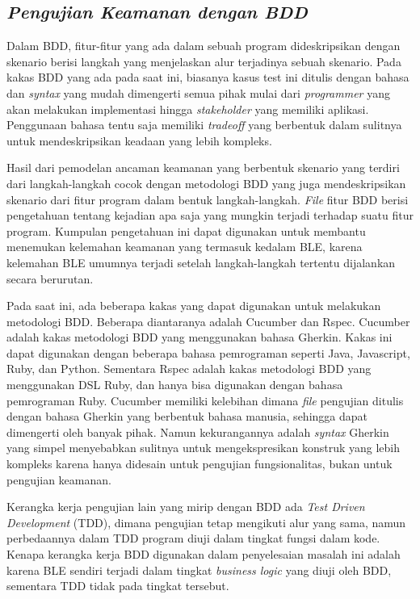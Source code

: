 \subsection{\textit{Pengujian Keamanan dengan BDD}}

Dalam BDD, fitur-fitur yang ada dalam sebuah program dideskripsikan dengan skenario
berisi langkah yang menjelaskan alur terjadinya sebuah skenario. Pada kakas BDD
yang ada pada saat ini, biasanya kasus test ini ditulis dengan bahasa dan \emph{syntax}
yang mudah dimengerti semua pihak mulai dari \emph{programmer} yang akan melakukan implementasi
hingga \emph{stakeholder} yang memiliki aplikasi. Penggunaan bahasa tentu saja memiliki \emph{tradeoff}
yang berbentuk dalam sulitnya untuk mendeskripsikan keadaan yang lebih kompleks.

Hasil dari pemodelan ancaman keamanan yang berbentuk skenario yang terdiri dari langkah-langkah
cocok dengan metodologi BDD yang juga mendeskripsikan skenario dari fitur program dalam bentuk
langkah-langkah. \emph{File} fitur BDD berisi pengetahuan tentang kejadian apa saja yang mungkin
terjadi terhadap suatu fitur program. Kumpulan pengetahuan ini dapat digunakan untuk
membantu menemukan kelemahan keamanan yang termasuk kedalam BLE, karena kelemahan BLE
umumnya terjadi setelah langkah-langkah tertentu dijalankan secara berurutan.

Pada saat ini, ada beberapa kakas yang dapat digunakan untuk melakukan metodologi BDD.
Beberapa diantaranya adalah Cucumber dan Rspec.
Cucumber adalah kakas metodologi BDD yang menggunakan bahasa Gherkin. Kakas ini dapat
digunakan dengan beberapa bahasa pemrograman seperti Java, Javascript, Ruby, dan Python.
Sementara Rspec adalah kakas metodologi BDD yang menggunakan DSL Ruby, dan hanya bisa
digunakan dengan bahasa pemrograman Ruby.
Cucumber memiliki kelebihan dimana \emph{file} pengujian ditulis dengan bahasa Gherkin
yang berbentuk bahasa manusia, sehingga dapat dimengerti oleh banyak pihak. Namun kekurangannya
adalah \emph{syntax} Gherkin yang simpel menyebabkan sulitnya untuk mengekspresikan konstruk
yang lebih kompleks karena hanya didesain untuk pengujian fungsionalitas, bukan untuk
pengujian keamanan.

Kerangka kerja pengujian lain yang mirip dengan BDD ada \textit{Test Driven Development} (TDD),
dimana pengujian tetap mengikuti alur yang sama, namun perbedaannya dalam TDD program diuji dalam
tingkat fungsi dalam kode. Kenapa kerangka kerja BDD digunakan dalam penyelesaian masalah ini adalah
karena BLE sendiri terjadi dalam tingkat \textit{business logic} yang diuji oleh BDD, sementara TDD
tidak pada tingkat tersebut.



